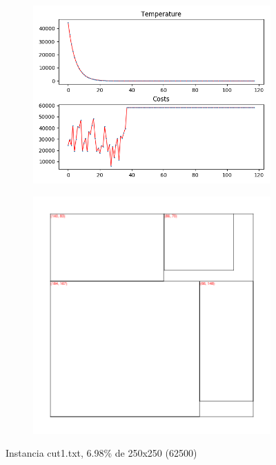 \begin{figure}
\centering
\begin{subfigure}{.5\textwidth}
  \centering
  \includegraphics[width=1\linewidth]{results/cut1/2/plot}
  \label{fig:sub1}
\end{subfigure}%
\begin{subfigure}{.5\textwidth}
  \centering
  \includegraphics[width=1\linewidth]{results/cut1/2/cut}
  \label{fig:sub2}
\end{subfigure}
\caption{Instancia cut1.txt, 6.98\% de 250x250 (62500)}
\label{fig:test}
\end{figure}


